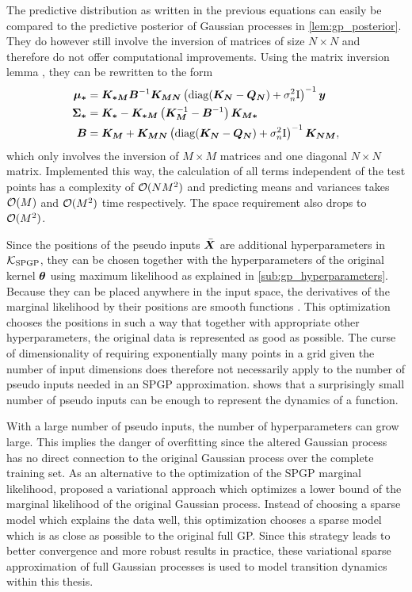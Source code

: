 The predictive distribution as written in the previous equations can easily be compared to the predictive posterior of Gaussian processes in \cref{lem:gp_posterior}.
They do however still involve the inversion of matrices of size $N \times N$ and therefore do not offer computational improvements.
Using the matrix inversion lemma \cite{petersen_matrix_2008}, they can be rewritten to the form
\begin{align}
    \bm{\mu_\ast} &= \bm{K_{\ast M}} \bm{B}^{-1} \bm{K_{MN}} \left( \operatorname{diag}(\bm{K_N} - \bm{Q_N}) + \sigma_n^2 \mathrm{I} \right)^{-1} \bm{y} \\
    \bm{\Sigma_\ast} &= \bm{K_\ast} - \bm{K_{\ast M}} \left( \bm{K_M}^{-1} - \bm{B}^{-1} \right) \bm{K_{M \ast}} \\
    \bm{B} &= \bm{K_M} + \bm{K_{MN}} \left( \operatorname{diag}(\bm{K_N} - \bm{Q_N}) + \sigma_n^2 \mathrm{I} \right)^{-1} \bm{K_{NM}},
\end{align}
which only involves the inversion of $M \times M$ matrices and one diagonal $N \times N$ matrix.
Implemented this way, the calculation of all terms independent of the test points has a complexity of $\operatorname{\mathcal{O}}(NM^2)$ and predicting means and variances takes $\operatorname{\mathcal{O}}(M)$ and $\operatorname{\mathcal{O}}(M^2)$ time respectively.
The space requirement also drops to $\operatorname{\mathcal{O}}(M^2)$.

Since the positions of the pseudo inputs $\bar{\bm{X}}$ are additional hyperparameters in $\operatorname{\mathcal{K}}_{\text{SPGP}}$, they can be chosen together with the hyperparameters of the original kernel $\bm{\theta}$ using maximum likelihood as explained in \cref{sub:gp_hyperparameters}.
Because they can be placed anywhere in the input space, the derivatives of the marginal likelihood by their positions are smooth functions \cite{snelson_sparse_2005}.
This optimization chooses the positions in such a way that together with appropriate other hyperparameters, the original data is represented as good as possible.
The curse of dimensionality of requiring exponentially many points in a grid given the number of input dimensions does therefore not necessarily apply to the number of pseudo inputs needed in an SPGP approximation.
 shows that a surprisingly small number of pseudo inputs can be enough to represent the dynamics of a function.

With a large number of pseudo inputs, the number of hyperparameters can grow large.
This implies the danger of overfitting since the altered Gaussian process has no direct connection to the original Gaussian process over the complete training set.
As an alternative to the optimization of the SPGP marginal likelihood, \citeauthor{titsias_variational_2009} proposed a variational approach \cite{titsias_variational_2009} which optimizes a lower bound of the marginal likelihood of the original Gaussian process.
Instead of choosing a sparse model which explains the data well, this optimization chooses a sparse model which is as close as possible to the original full GP.
Since this strategy leads to better convergence and more robust results in practice, these variational sparse approximation of full Gaussian processes is used to model transition dynamics within this thesis.

